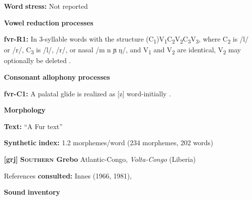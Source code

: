 \begin{styleBody}
\textbf{Word} \textbf{stress:} Not reported
\end{styleBody}

\begin{styleBody}
\textbf{Vowel} \textbf{reduction} \textbf{processes}
\end{styleBody}

\begin{styleBody}
\textbf{fvr-R1:} In 3-syllable words with the structure (C\textsubscript{1})V\textsubscript{1}C\textsubscript{2}V\textsubscript{2}C\textsubscript{3}V\textsubscript{3}, where C\textsubscript{2} is /l/ or /r/, C\textsubscript{3} is /l/, /r/, or nasal /m n ɲ ŋ/, and V\textsubscript{1} and V\textsubscript{2} are identical, V\textsubscript{2} may optionally be deleted \citep[60-61]{Jakobi1990}.
\end{styleBody}

\begin{styleBody}
\textbf{Consonant} \textbf{allophony} \textbf{processes}
\end{styleBody}

\begin{styleBody}
\textbf{fvr-C1:} A palatal glide is realized as [z] word-initially \citep[19]{Jakobi1990}.
\end{styleBody}

\begin{styleBody}
\textbf{Morphology}
\end{styleBody}

\begin{styleBody}
\textbf{Text:} “A Fur text” \citep[125-127]{Jakobi1990}
\end{styleBody}

\begin{styleBody}
\textbf{Synthetic} \textbf{index:} 1.2 morphemes/word (234 morphemes, 202 words)
\end{styleBody}

\begin{styleBody}
\textbf{[grj]}   \textbf{\textsc{Southern} \textbf{Grebo}}  Atlantic-Congo, \textit{Volta-Congo} (Liberia)
\end{styleBody}

\begin{styleBody}
References \textbf{consulted:} Innes (1966, 1981), \citet{Newman1986}
\end{styleBody}

\begin{styleBody}
\textbf{Sound} \textbf{inventory}
\end{styleBody}

